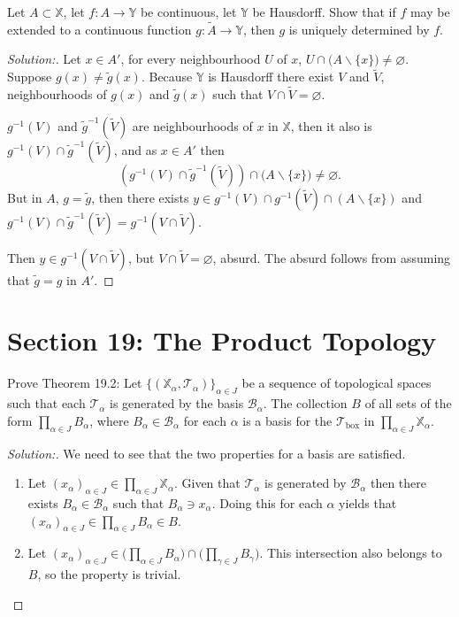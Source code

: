 \documentclass[a4paper,12pt, reqno]{article}
\theoremstyle{definition}
\newenvironment{exerr}[1]{
  \renewcommand\theexeralt{#1}
  \exeralt
}{\endexeralt}
\newenvironment{solution}{\begin{proof}[Solution:]}{\end{proof}}
\newcommand{\T}{\mathscr{T}}
\newcommand{\B}{\mathscr{B}}
\newcommand{\X}{\mathbb{X}}
\newcommand{\Y}{\mathbb{Y}}
\begin{document}
\begin{exerr}{13}
  Let $A\subset\X$, let $f:A\to\Y$ be continuous, let $\Y$ be Hausdorff. Show that if $f$ may be extended to a continuous function $g:\widetilde{A}\to\Y$, then $g$ is uniquely determined by $f$.
\end{exerr}
\begin{solution}
  Let $x\in A'$, for every neighbourhood $U$ of $x$, $U\cap\big( A\backslash\{ x \} \big) \neq \varnothing$. Suppose $g(x)\neq \widetilde{g}(x)$. Because $\Y$ is Hausdorff there exist $V$ and $\widetilde{V}$, neighbourhoods of $g(x)$ and $\widetilde{g}(x)$ such that $V\cap \widetilde{V} = \varnothing$.

  $g^{-1}(V)$ and $\widetilde{g}^{-1}(\widetilde{V})$ are neighbourhoods of $x$ in $\X$, then it also is $g^{-1}(V)\cap \widetilde{g}^{-1}(\widetilde{V})$, and as $x\in A'$ then
  \begin{equation*}
    (g^{-1}(V)\cap \widetilde{g}^{-1}(\widetilde{V}))\cap\big( A\backslash\{ x \} \big)\neq \varnothing.
  \end{equation*}
  But in $A$, $g = \widetilde{g}$, then there exists $y\in g^{-1}(V)\cap g^{-1}(\widetilde{V})\cap(A\backslash\{ x \})$ and $g^{-1}(V)\cap \widetilde{g}^{-1}(\widetilde{V}) = g^{-1}(V\cap \widetilde{V})$.

  Then $y\in g^{-1}(V\cap \widetilde{V})$, but $V\cap \widetilde{V} =\varnothing$, absurd. The absurd follows from assuming that $\widetilde{g} = g$ in $A'$.
\end{solution}

\section*{Section 19: The Product Topology}

\begin{exerr}{1}
  Prove Theorem 19.2: Let $\{ (\X_{\alpha},\T_{\alpha}) \}_{\alpha\in J}$ be a sequence of topological spaces such that each $\T_{\alpha}$ is generated by the basis $\B_{\alpha}$. The collection $B$ of all sets of the form $\prod_{\alpha\in J}B_{\alpha}$, where $B_{\alpha}\in\B_{\alpha}$ for each $\alpha$ is a basis for the $\T_{\text{box}}$ in $\prod_{\alpha\in J}\X_{\alpha}$.
\end{exerr}
\begin{solution}
  We need to see that the two properties for a basis are satisfied.
  \begin{enumerate}
    \item Let $(x_{\alpha})_{\alpha\in J}\in\prod_{\alpha\in J}\X_{\alpha}$. Given that $\T_{\alpha}$ is generated by $\B_{\alpha}$ then there exists $B_{\alpha}\in\B_{\alpha}$ such that $B_{\alpha}\ni x_{\alpha}$. Doing this for each $\alpha$ yields that $(x_{\alpha})_{\alpha\in J}\in\prod_{\alpha\in J}B_{\alpha}\in B$.
    \item Let $(x_{\alpha})_{\alpha\in J}\in \Big( \prod_{\alpha\in J}B_{\alpha} \Big)\cap \Big( \prod_{\gamma\in J}B_{\gamma} \Big)$. This intersection also belongs to $B$, so the property is trivial.
  \end{enumerate}
\end{solution}
\end{document}
